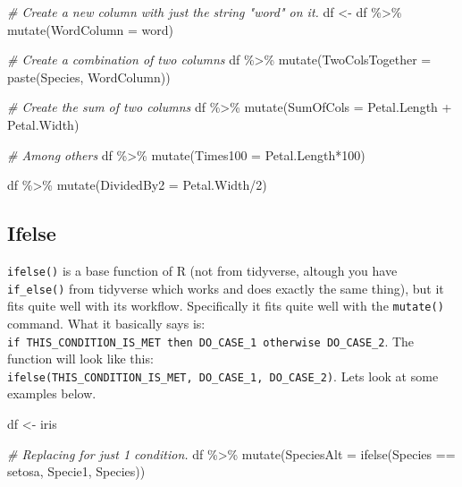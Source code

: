 \documentclass[
]{book}
\newenvironment{Shaded}{\begin{snugshade}}{\end{snugshade}}
\newcommand{\AttributeTok}[1]{\textcolor[rgb]{0.77,0.63,0.00}{#1}}
\newcommand{\CommentTok}[1]{\textcolor[rgb]{0.56,0.35,0.01}{\textit{#1}}}
\newcommand{\DecValTok}[1]{\textcolor[rgb]{0.00,0.00,0.81}{#1}}
\newcommand{\FunctionTok}[1]{\textcolor[rgb]{0.00,0.00,0.00}{#1}}
\newcommand{\NormalTok}[1]{#1}
\newcommand{\OtherTok}[1]{\textcolor[rgb]{0.56,0.35,0.01}{#1}}
\newcommand{\SpecialCharTok}[1]{\textcolor[rgb]{0.00,0.00,0.00}{#1}}
\newcommand{\StringTok}[1]{\textcolor[rgb]{0.31,0.60,0.02}{#1}}
\begin{document}
\begin{Shaded}
\begin{Highlighting}[]
\CommentTok{\# Create a new column with just the string "word" on it.}
\NormalTok{df }\OtherTok{\textless{}{-}}\NormalTok{ df }\SpecialCharTok{\%\textgreater{}\%} 
  \FunctionTok{mutate}\NormalTok{(}\AttributeTok{WordColumn =} \StringTok{\textquotesingle{}word\textquotesingle{}}\NormalTok{)}

\CommentTok{\# Create a combination of two columns}
\NormalTok{df }\SpecialCharTok{\%\textgreater{}\%} 
  \FunctionTok{mutate}\NormalTok{(}\AttributeTok{TwoColsTogether =} \FunctionTok{paste}\NormalTok{(Species, WordColumn))}

\CommentTok{\# Create the sum of two columns}
\NormalTok{df }\SpecialCharTok{\%\textgreater{}\%} 
  \FunctionTok{mutate}\NormalTok{(}\AttributeTok{SumOfCols =}\NormalTok{ Petal.Length }\SpecialCharTok{+}\NormalTok{ Petal.Width)}

\CommentTok{\# Among others}
\NormalTok{df }\SpecialCharTok{\%\textgreater{}\%} 
  \FunctionTok{mutate}\NormalTok{(}\AttributeTok{Times100 =}\NormalTok{ Petal.Length}\SpecialCharTok{*}\DecValTok{100}\NormalTok{)}

\NormalTok{df }\SpecialCharTok{\%\textgreater{}\%} 
  \FunctionTok{mutate}\NormalTok{(}\AttributeTok{DividedBy2 =}\NormalTok{ Petal.Width}\SpecialCharTok{/}\DecValTok{2}\NormalTok{)}
\end{Highlighting}
\end{Shaded}

\hypertarget{ifelse}{%
\subsection{Ifelse}\label{ifelse}}

\texttt{ifelse()} is a base function of R (not from tidyverse, altough you have \texttt{if\_else()} from tidyverse which works and does exactly the same thing), but it fits quite well with its workflow.
Specifically it fits quite well with the \texttt{mutate()} command.
What it basically says is: \texttt{if\ THIS\_CONDITION\_IS\_MET\ then\ DO\_CASE\_1\ otherwise\ DO\_CASE\_2}.
The function will look like this: \texttt{ifelse(THIS\_CONDITION\_IS\_MET,\ DO\_CASE\_1,\ DO\_CASE\_2)}.
Lets look at some examples below.

\begin{Shaded}
\begin{Highlighting}[]
\NormalTok{df }\OtherTok{\textless{}{-}}\NormalTok{ iris}

\CommentTok{\# Replacing for just 1 condition.}
\NormalTok{df }\SpecialCharTok{\%\textgreater{}\%} 
  \FunctionTok{mutate}\NormalTok{(}\AttributeTok{SpeciesAlt =} \FunctionTok{ifelse}\NormalTok{(Species }\SpecialCharTok{==} \StringTok{\textquotesingle{}setosa\textquotesingle{}}\NormalTok{, }\StringTok{\textquotesingle{}Specie1\textquotesingle{}}\NormalTok{, Species))}
\end{Highlighting}
\end{Shaded}
\end{document}
